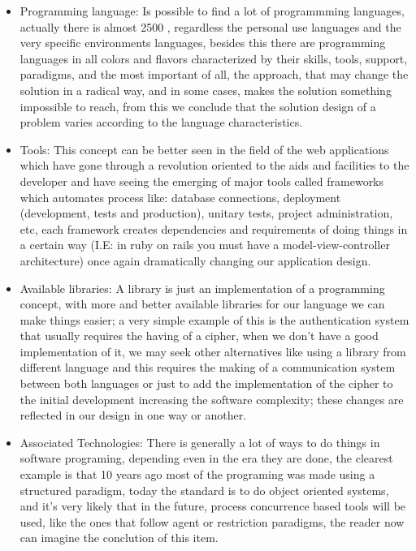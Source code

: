 \begin{itemize}
	
	\item{Programming language}: Is possible to find a lot of programmming languages, actually there is almost 2500 \cite{langs_list}, regardless the personal use languages and the very specific environments languages, besides this there are programming languages in all colors and flavors characterized by their skills, tools, support, paradigms, and the most important of all, the approach, that may change the solution in a radical way, and in some cases, makes the solution something impossible to reach, from this we conclude that the solution design of a problem varies according to the language characteristics.
	\newline
	
	\item{Tools}: This concept can be better seen in the field of the web applications which have gone through a revolution oriented to the aids and facilities to the developer and have seeing the emerging of major tools called frameworks which automates process like: database connections, deployment (development, tests and production), unitary tests, project administration, etc, each framework creates dependencies and requirements of doing things in a certain way (I.E: in ruby on rails you must have a model-view-controller architecture) once again dramatically changing our application design.
	\newline
	
	\item{Available libraries}: A library is just an implementation of a programming concept, with more and better available libraries for our language we can make things easier; a very simple example of this is the authentication system that usually requires the having of a cipher, when we don't have a good implementation of it, we may seek other alternatives like using a library from different language and this requires the making of a communication system between both languages or just to add the implementation of the cipher to the initial development increasing the software complexity; these changes are reflected in our design in one way or another.
	\newline
	
	\item{Associated Technologies}: There is generally a lot of ways to do things in software programing, depending even in the era they are done, the clearest example is that 10 years ago most of the programing was made using a structured paradigm, today the standard is to do object oriented systems, and it's very likely that in the future, process concurrence based tools will be used, like the ones that follow agent or restriction paradigms, the reader now can imagine the conclution of this item.
	\newline
	
\end{itemize}


